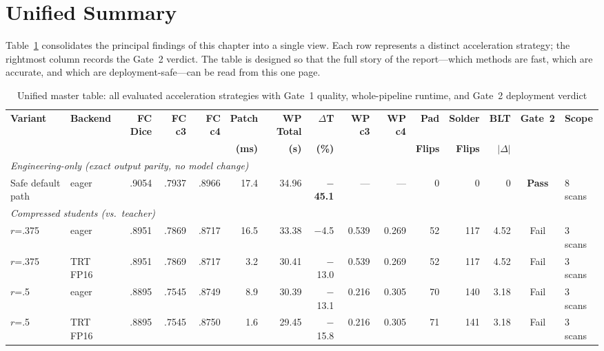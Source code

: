 \hypertarget{unified-summary}{%
\section{Unified Summary}\label{unified-summary}}

Table~\ref{tab:master} consolidates the principal findings of this chapter into a single view. Each row represents a distinct acceleration strategy; the rightmost column records the Gate~2 verdict. The table is designed so that the full story of the report---which methods are fast, which are accurate, and which are deployment-safe---can be read from this one page.

\begin{table}[H]
\centering
\caption{Unified master table: all evaluated acceleration strategies with Gate~1 quality, whole-pipeline runtime, and Gate~2 deployment verdict}
\label{tab:master}
\begin{adjustbox}{max width=\textwidth}
\renewcommand{\arraystretch}{1.15}
\scriptsize
{}
\begin{tabular}{ll | rrr | rrr | rr | rr | r | c | l}
\toprule
\textbf{Variant} & \textbf{Backend}
  & \textbf{FC Dice} & \textbf{FC c3} & \textbf{FC c4}
  & \textbf{Patch} & \textbf{WP Total} & \textbf{$\Delta$T}
  & \textbf{WP c3} & \textbf{WP c4}
  & \textbf{Pad} & \textbf{Solder}
  & \textbf{BLT}
  & \textbf{Gate~2}
  & \textbf{Scope} \\
& & & & & \textbf{(ms)} & \textbf{(s)} & \textbf{(\%)}
  & & & \textbf{Flips} & \textbf{Flips} & \textbf{$|\Delta|$} & & \\
\midrule
\multicolumn{15}{l}{\textit{Engineering-only (exact output parity, no model change)}} \\
Safe default path & eager & .9054 & .7937 & .8966 & 17.4 & 34.96 & \textbf{$-$45.1} & --- & --- & 0 & 0 & 0 & \textbf{Pass} & 8 scans \\
\midrule
\multicolumn{15}{l}{\textit{Compressed students (vs.\ teacher)}} \\
$r$=.375 & eager    & .8951 & .7869 & .8717 & 16.5 & 33.38 & $-$4.5  & 0.539 & 0.269 & 52 & 117 & 4.52 & Fail & 3 scans \\
$r$=.375 & TRT FP16 & .8951 & .7869 & .8717 &  3.2 & 30.41 & $-$13.0 & 0.539 & 0.269 & 52 & 117 & 4.52 & Fail & 3 scans \\
$r$=.5   & eager    & .8895 & .7545 & .8749 &  8.9 & 30.39 & $-$13.1 & 0.216 & 0.305 & 70 & 140 & 3.18 & Fail & 3 scans \\
$r$=.5   & TRT FP16 & .8895 & .7545 & .8750 &  1.6 & 29.45 & $-$15.8 & 0.216 & 0.305 & 71 & 141 & 3.18 & Fail & 3 scans \\

\end{tabular}
\end{adjustbox}
\end{table}
